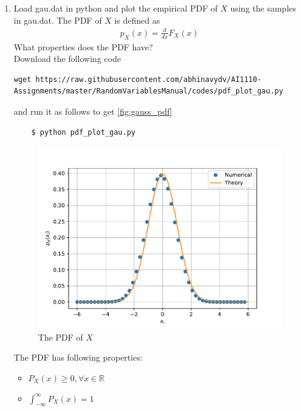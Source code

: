 \documentclass[journal,12pt,twocolumn]{IEEEtran}
\renewcommand\thesection{\arabic{section}}
\begin{document}
\begin{enumerate}[label=\thesection.\arabic*
        ,ref=\thesection.\theenumi]
    \item
          Load gau.dat in python and plot the empirical PDF of $X$ using the samples in gau.dat. The PDF of $X$ is defined as
          \begin{align}
              p_{X}(x) = \frac{d}{dx}F_{X}(x)
          \end{align}
          What properties does the PDF have?
          \\
          \solution  Download the following code
          \begin{lstlisting}
wget https://raw.githubusercontent.com/abhinavydv/AI1110-Assignments/master/RandomVariablesManual/codes/pdf_plot_gau.py
\end{lstlisting}
          and run it as follows to get \autoref{fig:gauss_pdf}
          \begin{lstlisting}
    $ python pdf_plot_gau.py
\end{lstlisting}

          \begin{figure}
              \centering
              \includegraphics[width=\columnwidth]{./figs/gauss_pdf}
              \caption{The PDF of $X$}
              \label{fig:gauss_pdf}
          \end{figure}

          The PDF has following properties:
          \begin{itemize}
              \item $P_X(x) \ge 0, \forall x \in \mathbb{R}$
              \item $\int_{-\infty}^\infty P_X(x) = 1$
          \end{itemize}


\end{enumerate}
\end{document}
